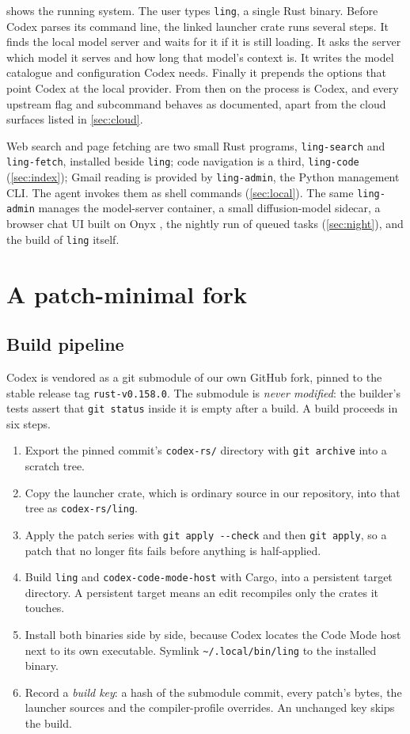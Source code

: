 \documentclass[11pt]{article}
\newcommand{\code}[1]{\texttt{#1}}
\begin{document}
 shows the running system. The user types \code{ling}, a single Rust binary.
Before Codex parses its command line, the linked launcher crate runs several steps. It finds the
local model server and waits for it if it is still loading. It asks the server which model it serves
and how long that model's context is. It writes the model catalogue and configuration Codex needs.
Finally it prepends the options that point Codex at the local provider. From then on the process is
Codex, and every upstream flag and subcommand behaves as documented, apart from the cloud surfaces
listed in \cref{sec:cloud}.

Web search and page fetching are two small Rust programs, \code{ling-search} and
\code{ling-fetch}, installed beside \code{ling}; code navigation is a third,
\code{ling-code} (\cref{sec:index}); Gmail reading is provided by
\code{ling-admin}, the Python management CLI. The agent invokes them as shell commands
(\cref{sec:local}). The same \code{ling-admin} manages the model-server container, a small
diffusion-model sidecar, a browser chat UI built on Onyx \cite{onyx}, the nightly run of queued
tasks (\cref{sec:night}), and the build of \code{ling} itself.

\section{A patch-minimal fork}
\label{sec:fork}

\subsection{Build pipeline}

Codex is vendored as a git submodule of our own GitHub fork, pinned to the stable release tag
\code{rust-v0.158.0}. The submodule is \emph{never modified}: the builder's tests assert that
\code{git status} inside it is empty after a build. A build proceeds in six steps.
\begin{enumerate}
  \item Export the pinned commit's \code{codex-rs/} directory with \code{git archive} into a scratch
    tree.
  \item Copy the launcher crate, which is ordinary source in our repository, into that tree as
    \code{codex-rs/ling}.
  \item Apply the patch series with \code{git apply -{}-check} and then \code{git apply}, so a patch
    that no longer fits fails before anything is half-applied.
  \item Build \code{ling} and \code{codex-code-mode-host} with Cargo, into a persistent target
    directory. A persistent target means an edit recompiles only the crates it touches.
  \item Install both binaries side by side, because Codex locates the Code Mode host next to its own
    executable. Symlink \code{\textasciitilde/.local/bin/ling} to the installed binary.
  \item Record a \emph{build key}: a hash of the submodule commit, every patch's bytes, the launcher
    sources and the compiler-profile overrides. An unchanged key skips the build.
\end{enumerate}
\end{document}
